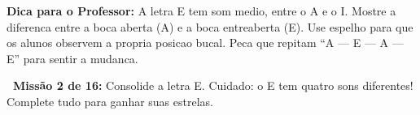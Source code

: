 \begin{dica}
\textbf{Dica para o Professor:} A letra E tem som medio, entre o A e o I. Mostre a diferenca entre a boca aberta (A) e a boca entreaberta (E). Use espelho para que os alunos observem a propria posicao bucal. Peca que repitam ``A --- E --- A --- E'' para sentir a mudanca.
\end{dica}





\begin{missao}
\textbf{\faGamepad~Miss\~a{}o 2 de 16:} Consolide a letra E. Cuidado: o E tem quatro sons diferentes! Complete tudo para ganhar suas estrelas.
\end{missao}

